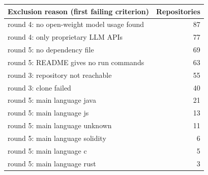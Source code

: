 \begin{tabular}{@{}l r@{}}
\toprule
Exclusion reason (first failing criterion) & Repositories \\
\midrule
round 4: no open-weight model usage found & 87 \\
round 4: only proprietary LLM APIs & 77 \\
round 5: no dependency file & 69 \\
round 5: README gives no run commands & 63 \\
round 3: repository not reachable & 55 \\
round 3: clone failed & 40 \\
round 5: main language java & 21 \\
round 5: main language js & 13 \\
round 5: main language unknown & 11 \\
round 5: main language solidity & 6 \\
round 5: main language c & 5 \\
round 5: main language rust & 3 \\
\bottomrule
\end{tabular}
